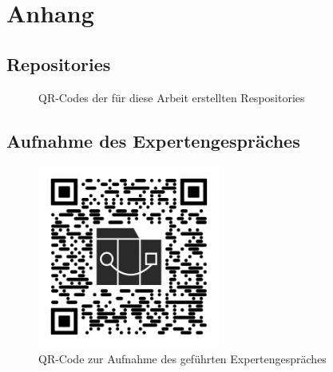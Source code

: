 \chapter*{Anhang}


\section{Repositories}\label{sec:repositories}
\begin{figure}[!ht]%
    \centering
    \qquad
    \caption{QR-Codes der für diese Arbeit erstellten Respositories}%
    \label{fig:repos}%
\end{figure}

\section{Aufnahme des Expertengespräches}\label{sec:aufnahme-des-expertengespräches}
\begin{figure}[!ht]
    \centering
    \includegraphics[width=6cm,height=6cm]{images/appendix/qr-rec}
    \caption{QR-Code zur Aufnahme des geführten Expertengespräches\footnotemark}
    \label{fig:rec}
\end{figure}

